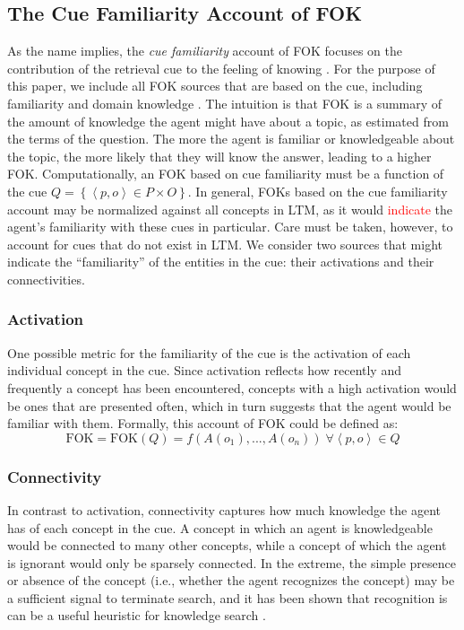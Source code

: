 \documentclass[10pt,letterpaper]{article}
\newcommand{\fixme}[2][]{#2}
\renewcommand{\fixme}[2][]{\textcolor{red}{#2}}
\newcommand{\setof}[1]{\left \{ #1 \right \}}
\newcommand{\tuple}[1]{\left \langle #1 \right \rangle }
\newcommand{\fok}[0]{\text{FOK}}
\begin{document}
\subsection{The Cue Familiarity Account of FOK}

As the name implies, the \textit{cue familiarity} account of FOK focuses on the contribution of the retrieval cue to the feeling of knowing \cite{Reder1992WhatDeterminesInitial,Metcalfe1993TheCueFamiliarity,Koriat2001TheCombinedContributions}.
For the purpose of this paper, we include all FOK sources that are based on the cue, including familiarity and domain knowledge \cite{Schwartz1994SourcesOfInformation}.
The intuition is that FOK is a summary of the amount of knowledge the agent might have about a topic, as estimated from the terms of the question.
The more the agent is familiar or knowledgeable about the topic, the more likely that they will know the answer, leading to a higher FOK.
Computationally, an FOK based on cue familiarity must be a function of the cue $Q = \setof{\tuple{p, o}{\in}P{\times}O}$.
In general, FOKs based on the cue familiarity account may be normalized against all concepts in LTM, as it would \fixme{indicate} the agent's familiarity with these cues in particular.
Care must be taken, however, to account for cues that do not exist in LTM.
We consider two sources that might indicate the ``familiarity'' of the entities in the cue: their activations and their connectivities.

\subsubsection{Activation}

One possible metric for the familiarity of the cue is the activation of each individual concept in the cue.
Since activation reflects how recently and frequently a concept has been encountered, concepts with a high activation would be ones that are presented often, which in turn suggests that the agent would be familiar with them.
Formally, this account of FOK could be defined as:
$$\fok = \fok(Q) = f\left(A(o_1), ..., A(o_n)\right) \; \forall {\tuple{p, o}{\in}Q}$$

\subsubsection{Connectivity}

In contrast to activation, connectivity captures how much knowledge the agent has of each concept in the cue.
A concept in which an agent is knowledgeable would be connected to many other concepts, while a concept of which the agent is ignorant would only be sparsely connected.
In the extreme, the simple presence or absence of the concept (i.e., whether the agent recognizes the concept) may be a sufficient signal to terminate search, and it has been shown that recognition is can be a useful heuristic for knowledge search \cite{Li2012FunctionalInteractionsBetween}.
\end{document}
